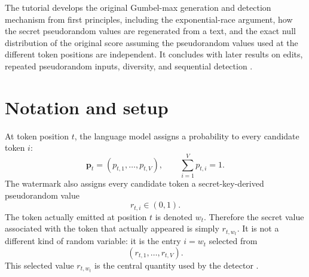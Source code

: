 \documentclass[11pt]{article}
\DeclareRobustCommand{\iperpaper}[2]{%
  \begingroup
  \hypersetup{pdfborder=0 0 0}%
  \href{iperpaper:#1}{{\color{iperpaperlink}#2}}%
  \endgroup
}
\def\iperpaper#1#2{#2}%
\begin{document}
The tutorial develops the original Gumbel-max generation and detection mechanism from first principles, including the exponential-race argument, how the secret pseudorandom values are regenerated from a text, and the exact null distribution of the original score assuming the pseudorandom values used at the different token positions are independent. It concludes with later results on edits, repeated pseudorandom inputs, diversity, and sequential detection \cite{li2025,fu2024,liedits2025,cai2025collision,huang2026,luo2026}.

\section{Notation and setup}

At token position $t$, the language model assigns a probability to every candidate token $i$:
\[
  \iperpaper{model_distribution}{\mathbf p_t=(p_{t,1},\ldots,p_{t,V})},
  \qquad \iperpaper{probability_normalization}{\sum_{i=1}^{V}p_{t,i}=1}.
\]
The watermark also assigns every candidate token a secret-key-derived pseudorandom value
\[
  \iperpaper{keyed_uniform}{r_{t,i}\in(0,1)}.
\]
The token actually emitted at position $t$ is denoted $\iperpaper{emitted_token}{w_t}$. Therefore the secret value associated with the token that actually appeared is simply $\iperpaper{selected_value}{r_{t,w_t}}$.
It is not a different kind of random variable: it is the entry $i=w_t$ selected from
\[
  (r_{t,1},\ldots,r_{t,V}).
\]
This selected value $\iperpaper{selected_value}{r_{t,w_t}}$ is the central quantity used by the detector \cite{aaronson2022,li2025}.

\end{document}
